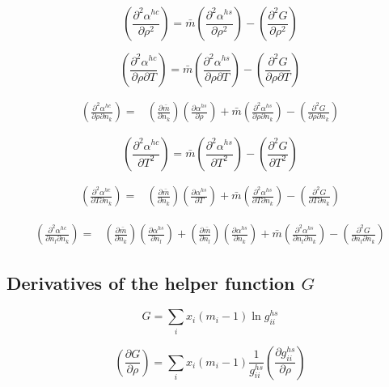 \documentclass[english]{../thermomemo/thermomemo}
\newcommand*{\pder}[2]{\left(\frac{\partial #1}{\partial #2}\right)}
\newcommand*{\pdder}[2]{\left(\frac{\partial^2 #1}{\partial #2^2}\right)}
\newcommand*{\pdcross}[3]{\left(\frac{\partial^2 #1}{\partial #2 \partial #3}\right)}
\begin{document}
\begin{equation}
  \pdder{\alpha^{hc}}{\rho} = \bar m \pdder{\alpha^{hs}}{\rho} - \pdder{G}{\rho}
\end{equation}

\begin{equation}
  \pdcross{\alpha^{hc}}{\rho}{T} = \bar m \pdcross{\alpha^{hs}}{\rho}{T} - \pdcross{G}{\rho}{T}
\end{equation}

\begin{equation}
  \begin{aligned}
    \pdcross{\alpha^{hc}}{\rho}{n_k} =& \pder{\bar m}{n_k} \pder{\alpha^{hs}}{\rho} + \bar m \pdcross{\alpha^{hs}}{\rho}{n_k} - \pdcross{G}{\rho}{n_k}
  \end{aligned}
\end{equation}

\begin{equation}
  \pdder{\alpha^{hc}}{T} = \bar m \pdder{\alpha^{hs}}{T} - \pdder{G}{T}
\end{equation}

\begin{equation}
  \begin{aligned}
    \pdcross{\alpha^{hc}}{T}{n_k} =& \pder{\bar m}{n_k} \pder{\alpha^{hs}}{T} + \bar m \pdcross{\alpha^{hs}}{T}{n_k} - \pdcross{G}{T}{n_k}
  \end{aligned}
\end{equation}

\begin{equation}
  \begin{aligned}
    \pdcross{\alpha^{hc}}{n_l}{n_k} =& \pder{\bar m}{n_k} \pder{\alpha^{hs}}{n_l} + \pder{\bar m}{n_l} \pder{\alpha^{hs}}{n_k} + \bar m \pdcross{\alpha^{hs}}{n_l}{n_k} - \pdcross{G}{n_l}{n_k}
  \end{aligned}
\end{equation}

\subsection*{Derivatives of the helper function $G$}
\begin{equation}
 G = \sum_i x_i(m_i-1)\ln g_{ii}^{hs}
\end{equation}

\begin{equation}
  \pder{G}{\rho} = \sum_i x_i(m_i-1) \frac{1}{g_{ii}^{hs}} \pder{g_{ii}^{hs}}{\rho}
\end{equation}
\end{document}
